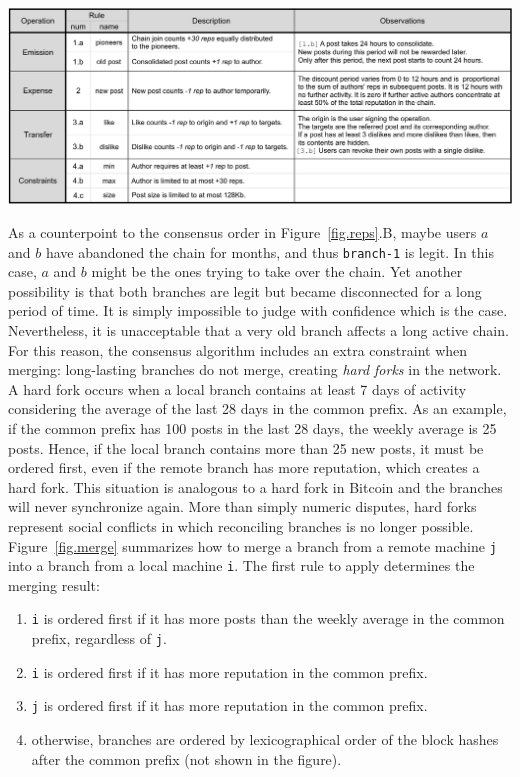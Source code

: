 \documentclass[10pt,journal,compsoc]{IEEEtran}
\newcommand{\FC}       {Freechains\xspace}
\newcommand{\code}[1]  {\texttt{\footnotesize{#1}}}
\begin{document}
\begin{table}
\centering
\includegraphics[width=\textwidth]{rules.png}
\caption{
    Specific reputation rules for public forum chains in \FC.
    The chosen constants ($30~reps$, $24h$, etc) are arbitrary and target
    typical Internet forums with moderate traffic.
    A future revision of the protocol could support them as chain parameters.
}
\label{fig.rules}
\end{table}

As a counterpoint to the consensus order in Figure~\ref{fig.reps}.B, maybe
users $a$ and $b$ have abandoned the chain for months, and thus \code{branch-1}
is legit.
In this case, $a$ and $b$ might be the ones trying to take over the chain.
Yet another possibility is that both branches are legit but became disconnected
for a long period of time.
It is simply impossible to judge with confidence which is the case.
Nevertheless, it is unacceptable that a very old branch affects a long active
chain.
For this reason, the consensus algorithm includes an extra constraint when
merging: long-lasting branches do not merge, creating \emph{hard forks} in the
network.
A hard fork occurs when a local branch contains at least 7 days of activity
considering the average of the last 28 days in the common prefix.
As an example, if the common prefix has 100 posts in the last 28 days, the
weekly average is 25 posts.
Hence, if the local branch contains more than 25 new posts, it must be ordered
first, even if the remote branch has more reputation, which creates a hard
fork.
This situation is analogous to a hard fork in Bitcoin and the branches will
never synchronize again.
More than simply numeric disputes, hard forks represent social conflicts in
which reconciling branches is no longer possible.
%
Figure~\ref{fig.merge} summarizes how to merge a branch from a remote machine
\code{j} into a branch from a local machine \code{i}.
The first rule to apply determines the merging result:
\begin{enumerate}
    \item \code{i} is ordered first if it has more posts than the weekly
          average in the common prefix, regardless of \code{j}.
    \item \code{i} is ordered first if it has more reputation in the common
          prefix.
    \item \code{j} is ordered first if it has more reputation in the common
          prefix.
    \item otherwise, branches are ordered by lexicographical order of the block
          hashes after the common prefix (not shown in the figure).
\end{enumerate}
\end{document}
